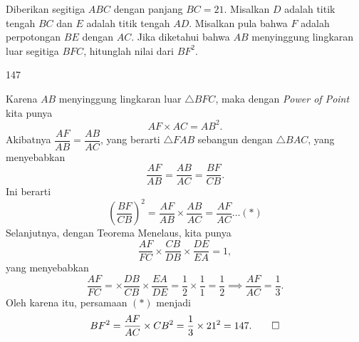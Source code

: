 \documentclass[11pt]{scrartcl}
\begin{document}
	\begin{soaljawab}
		Diberikan segitiga $ABC$ dengan panjang $BC = 21$. Misalkan $D $ adalah titik tengah
		$BC $ dan $E $ adalah titik tengah $AD$. Misalkan pula bahwa $F $ adalah perpotongan $BE$
		dengan $AC$. Jika diketahui bahwa $AB $ menyinggung lingkaran luar segitiga $BFC$,
		hitunglah nilai dari $BF^2$.
		
		\begin{jawaban}
		147
		\end{jawaban}
		\begin{solusi}
		Karena $AB$ menyinggung lingkaran luar $\triangle BFC$, maka dengan \textit{Power of Point} kita punya $$AF \times AC = AB^2.$$ Akibatnya $\dfrac{AF}{AB}=\dfrac{AB}{AC}$, yang berarti $\triangle FAB$ sebangun dengan $\triangle BAC$, yang menyebabkan $$\dfrac{AF}{AB}=\dfrac{AB}{AC}=\dfrac{BF}{CB}.$$ Ini berarti $$\left(\dfrac{BF}{CB}\right)^2=\dfrac{AF}{AB}\times\dfrac{AB}{AC}=\dfrac{AF}{AC}\dots(*)$$ Selanjutnya, dengan Teorema Menelaus, kita punya $$\dfrac{AF}{FC}\times\dfrac{CB}{DB}\times\dfrac{DE}{EA}=1,$$ yang menyebabkan $$\dfrac{AF}{FC}=\times\dfrac{DB}{CB}\times\dfrac{EA}{DE}=\dfrac{1}{2}\times\dfrac{1}{1}=\dfrac{1}{2} \implies \dfrac{AF}{AC} = \dfrac{1}{3}.$$ Oleh karena itu, persamaan $(*)$ menjadi $$BF^2=\dfrac{AF}{AC}\times CB^2=\dfrac{1}{3}\times 21^2=147.\qed $$ 
		\end{solusi}
	\end{soaljawab}
\end{document}
